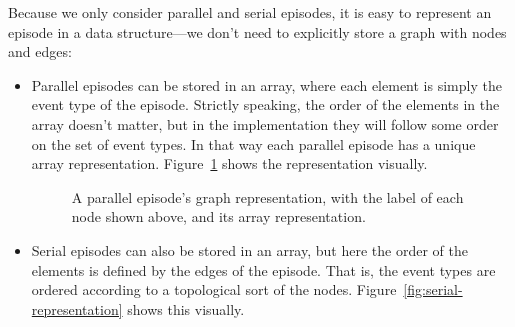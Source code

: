Because we only consider parallel and serial episodes, it is easy to represent an episode in a data structure---we don't need to explicitly store a graph with nodes and edges:
\begin{itemize}
\item Parallel episodes can be stored in an array, where each element is simply the event type of the episode. Strictly speaking, the order of the elements in the array doesn't matter, but in the implementation they will follow some order on the set of event types. In that way each parallel episode has a unique array representation. Figure~\ref{fig:parallel-representation} shows the representation visually.


\begin{figure}[h]
\centering


\caption{A parallel episode's graph representation, with the label of each node shown above, and its array representation.}

\label{fig:parallel-representation}
\end{figure}

\item Serial episodes can also be stored in an array, but here the order of the elements is defined by the edges of the episode. That is, the event types are ordered according to a topological sort of the nodes. Figure~\ref{fig:serial-representation} shows this visually.
\end{itemize}

